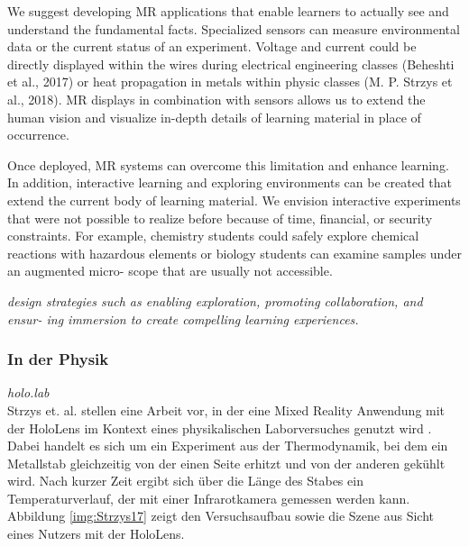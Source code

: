 We suggest developing MR applications that enable learners to actually see and understand the fundamental facts. Specialized sensors can measure environmental data or the current status of an experiment. Voltage and current could be directly displayed within the wires during electrical engineering classes (Beheshti et al., 2017) or heat propagation in metals within physic classes (M. P. Strzys et al., 2018). MR displays in combination with sensors allows us to extend the human vision and visualize in-depth details of learning material in place of occurrence.

Once deployed, MR systems can overcome this limitation and enhance learning. In addition, interactive learning and exploring environments can be created that extend the current body of learning material. We envision interactive experiments that were not possible to realize before because of time, financial, or security constraints. For example, chemistry students could safely explore chemical reactions with hazardous elements or biology students can examine samples under an augmented micro- scope that are usually not accessible.


\textit{design strategies such as enabling exploration, promoting collaboration, and ensur- ing immersion to create compelling learning experiences.}\cite{Knierim18}


\subsubsection{In der Physik}

\vspace{4px}
\textit{holo.lab}\\
Strzys et. al. stellen eine Arbeit vor, in der eine Mixed Reality Anwendung mit der HoloLens im Kontext eines physikalischen Laborversuches genutzt wird \cite{Strzys17}. Dabei handelt es sich um ein Experiment aus der Thermodynamik, bei dem ein Metallstab gleichzeitig von der einen Seite erhitzt und von der anderen gekühlt wird. Nach kurzer Zeit ergibt sich über die Länge des Stabes ein Temperaturverlauf, der mit einer Infrarotkamera gemessen werden kann. Abbildung \ref{img:Strzys17} zeigt den Versuchsaufbau sowie die Szene aus Sicht eines Nutzers mit der HoloLens.\\

